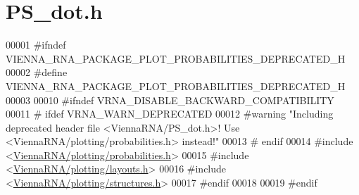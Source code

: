 \hypertarget{PS__dot_8h_source}{}\section{P\+S\+\_\+dot.\+h}
\label{PS__dot_8h_source}

\begin{DoxyCode}
00001 \textcolor{preprocessor}{#ifndef VIENNA\_RNA\_PACKAGE\_PLOT\_PROBABILITIES\_DEPRECATED\_H}
00002 \textcolor{preprocessor}{#define VIENNA\_RNA\_PACKAGE\_PLOT\_PROBABILITIES\_DEPRECATED\_H}
00003 
00010 \textcolor{preprocessor}{#ifndef VRNA\_DISABLE\_BACKWARD\_COMPATIBILITY}
00011 \textcolor{preprocessor}{# ifdef VRNA\_WARN\_DEPRECATED}
00012 \textcolor{preprocessor}{#warning "Including deprecated header file <ViennaRNA/PS\_dot.h>! Use <ViennaRNA/plotting/probabilities.h>
       instead!"}
00013 \textcolor{preprocessor}{# endif}
00014 \textcolor{preprocessor}{#include <\hyperlink{probabilities_8h}{ViennaRNA/plotting/probabilities.h}>}
00015 \textcolor{preprocessor}{#include <\hyperlink{layouts_8h}{ViennaRNA/plotting/layouts.h}>}
00016 \textcolor{preprocessor}{#include <\hyperlink{plotting_2structures_8h}{ViennaRNA/plotting/structures.h}>}
00017 \textcolor{preprocessor}{#endif}
00018 
00019 \textcolor{preprocessor}{#endif}
\end{DoxyCode}
